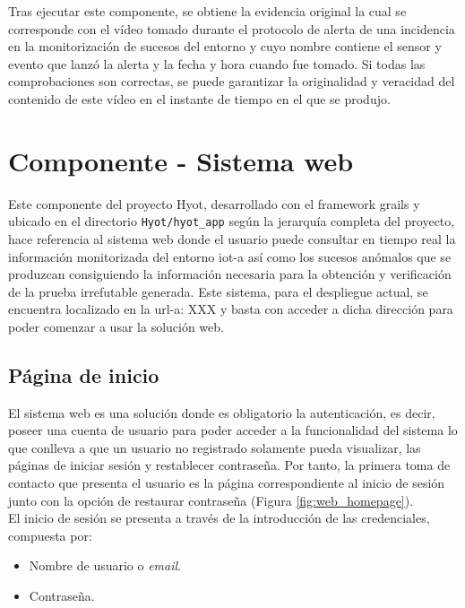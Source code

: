 \documentclass[12pt,a4paper, twoside]{report}
\begin{document}
	Tras ejecutar este componente, se obtiene la evidencia original la cual se corresponde con el vídeo tomado durante el protocolo de alerta de una incidencia en la monitorización de sucesos del entorno y cuyo nombre contiene el sensor y evento que lanzó la alerta y la fecha y hora cuando fue tomado. Si todas las comprobaciones son correctas, se puede garantizar la originalidad y veracidad del contenido de este vídeo en el instante de tiempo en el que se produjo.
			
	\section{Componente - Sistema web}
	 	 
	 Este componente del proyecto Hyot, desarrollado con el \gls{framework} \gls{grails} y ubicado en el directorio \texttt{Hyot/hyot\_app} según la jerarquía completa del proyecto, hace referencia al sistema web donde el usuario puede consultar en tiempo real la información monitorizada del entorno \gls{iot-a} así como los sucesos anómalos que se produzcan consiguiendo la información necesaria para la obtención y verificación de la prueba irrefutable generada. Este sistema, para el despliegue actual, se encuentra localizado en la \gls{url-a}: XXX y basta con acceder a dicha dirección para poder comenzar a usar la solución web.
			
	\subsection{Página de inicio}
	
	El sistema web es una solución donde es obligatorio la autenticación, es decir, poseer una cuenta de usuario para poder acceder a la funcionalidad del sistema lo que conlleva a que un usuario no registrado solamente pueda visualizar, las páginas de iniciar sesión y restablecer contraseña. Por tanto, la primera toma de contacto que presenta el usuario es la página correspondiente al inicio de sesión junto con la opción de restaurar contraseña (Figura \ref{fig:web_homepage}). \\
		
	El inicio de sesión se presenta a través de la introducción de las credenciales, compuesta por:
	
	\begin{itemize}
		\item Nombre de usuario o \textit{email}.
		\item Contraseña.
	\end{itemize}
	
\end{document}
